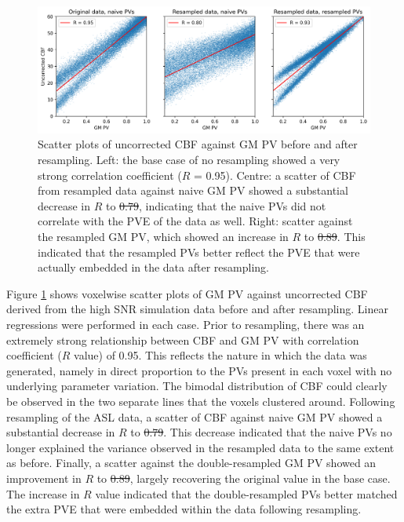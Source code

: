 \documentclass[12pt]{report}
\providecommand{\DIFaddtex}[1]{{\protect\color{blue}\uwave{#1}}} %
\providecommand{\DIFdeltex}[1]{{\protect\color{red}\sout{#1}}}                      %
\providecommand{\DIFaddbegin}{} %
\providecommand{\DIFaddend}{} %
\providecommand{\DIFdelbegin}{} %
\providecommand{\DIFdelend}{} %
\providecommand{\DIFaddFL}[1]{\DIFadd{#1}} %
\providecommand{\DIFdelFL}[1]{\DIFdel{#1}} %
\providecommand{\DIFaddbeginFL}{} %
\providecommand{\DIFaddendFL}{} %
\providecommand{\DIFdelbeginFL}{} %
\providecommand{\DIFdelendFL}{} %
\providecommand{\DIFadd}[1]{\texorpdfstring{\DIFaddtex{#1}}{#1}} %
\providecommand{\DIFdel}[1]{\texorpdfstring{\DIFdeltex{#1}}{}} %
\newcommand{\DIFscaledelfig}{0.5}
\newlength{\DIFdelgraphicswidth} %
\newlength{\DIFdelgraphicsheight} %
\newcommand{\DIFaddincludegraphics}[2][]{{\color{blue}\fbox{\DIFOincludegraphics[#1]{#2}}}} %
\newcommand{\DIFdelincludegraphics}[2][]{%
\sbox{\DIFdelgraphicsbox}{\DIFOincludegraphics[#1]{#2}}%
\settoboxwidth{\DIFdelgraphicswidth}{\DIFdelgraphicsbox} %
\settoboxtotalheight{\DIFdelgraphicsheight}{\DIFdelgraphicsbox} %
\scalebox{\DIFscaledelfig}{%
\parbox[b]{\DIFdelgraphicswidth}{\usebox{\DIFdelgraphicsbox}\\[-\baselineskip] \rule{\DIFdelgraphicswidth}{0em}}\llap{\resizebox{\DIFdelgraphicswidth}{\DIFdelgraphicsheight}{%
\setlength{\unitlength}{\DIFdelgraphicswidth}%
\begin{picture}(1,1)%
\thicklines\linethickness{2pt} %
{\color[rgb]{1,0,0}\put(0,0){\framebox(1,1){}}}%
{\color[rgb]{1,0,0}\put(0,0){\line( 1,1){1}}}%
{\color[rgb]{1,0,0}\put(0,1){\line(1,-1){1}}}%
\end{picture}%
}\hspace*{3pt}}} %
} %
\DeclareRobustCommand{\DIFaddbegin}{\DIFOaddbegin \let\includegraphics\DIFaddincludegraphics} %
\DeclareRobustCommand{\DIFaddend}{\DIFOaddend \let\includegraphics\DIFOincludegraphics} %
\DeclareRobustCommand{\DIFdelbegin}{\DIFOdelbegin \let\includegraphics\DIFdelincludegraphics} %
\DeclareRobustCommand{\DIFdelend}{\DIFOaddend \let\includegraphics\DIFOincludegraphics} %
\DeclareRobustCommand{\DIFaddbeginFL}{\DIFOaddbeginFL \let\includegraphics\DIFaddincludegraphics} %
\DeclareRobustCommand{\DIFaddendFL}{\DIFOaddendFL \let\includegraphics\DIFOincludegraphics} %
\DeclareRobustCommand{\DIFdelbeginFL}{\DIFOdelbeginFL \let\includegraphics\DIFdelincludegraphics} %
\DeclareRobustCommand{\DIFdelendFL}{\DIFOaddendFL \let\includegraphics\DIFOincludegraphics} %
\begin{document}
\begin{figure}[H]
\centering
\includegraphics[width = \textwidth]{sim_asl_resamp_scatter.png}
\caption{Scatter plots of uncorrected CBF against GM PV before and after resampling. Left: the base case of no resampling showed a very strong correlation coefficient ($R$ = 0.95). Centre: a scatter of CBF from resampled data against naive GM PV showed a substantial decrease in $R$ to \DIFdelbeginFL \DIFdelFL{0.79}\DIFdelendFL \DIFaddbeginFL \DIFaddFL{0.80}\DIFaddendFL , indicating that the naive PVs did not correlate with the PVE of the data as well. Right: scatter against the resampled GM PV, which showed an increase in $R$ to \DIFdelbeginFL \DIFdelFL{0.89}\DIFdelendFL \DIFaddbeginFL \DIFaddFL{0.93}\DIFaddendFL . This indicated that the resampled PVs better reflect the PVE that were actually embedded in the data after resampling.}
\label{sim_asl_resamp_scatter}
\end{figure}

Figure \ref{sim_asl_resamp_scatter} shows voxelwise scatter plots of GM PV against uncorrected CBF derived from the high SNR simulation data before and after resampling. Linear regressions were performed in each case. Prior to resampling, there was an extremely strong relationship between CBF and GM PV with correlation coefficient ($R$ value) of 0.95. This reflects the nature in which the data was generated, namely in direct proportion to the PVs present in each voxel with no underlying parameter variation. The bimodal distribution of CBF could clearly be observed in the two separate lines that the voxels clustered around. Following resampling of the ASL data, a scatter of CBF against naive GM PV showed a substantial decrease in $R$ to \DIFdelbegin \DIFdel{0.79}\DIFdelend \DIFaddbegin \DIFadd{0.80}\DIFaddend . This decrease indicated that the naive PVs no longer explained the variance observed in the resampled data to the same extent as before. Finally, a scatter against the double-resampled GM PV showed an improvement in $R$ to \DIFdelbegin \DIFdel{0.89}\DIFdelend \DIFaddbegin \DIFadd{0.93}\DIFaddend , 
largely recovering the original value in the base case. The increase in $R$ value indicated that the double-resampled PVs better matched the extra PVE that were embedded within the data following resampling. 
\end{document}
